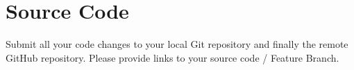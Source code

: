 
\section{Source Code}
Submit all your code changes to your local Git repository and finally the remote GitHub repository. 
Please provide links to your source code / Feature Branch. 